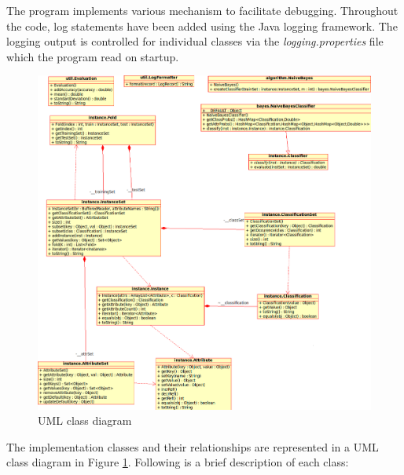 \documentclass[10pt]{report}
\begin{document}
The program implements various mechanism to facilitate
debugging. Throughout the code, log statements have been added using
the Java logging framework. The logging output is controlled for
individual classes via the \textit{logging.properties} file which the program
read on startup.

\begin{figure}
  \begin{center}
	\includegraphics[width=\textwidth,height=!]{uml}
  \end{center}
  \caption{UML class diagram}
  \label{fig:uml}
\end{figure} 

The implementation classes and their relationships are represented in a UML
class diagram in Figure \ref{fig:uml}. Following is a brief
description of each class:
\end{document}

